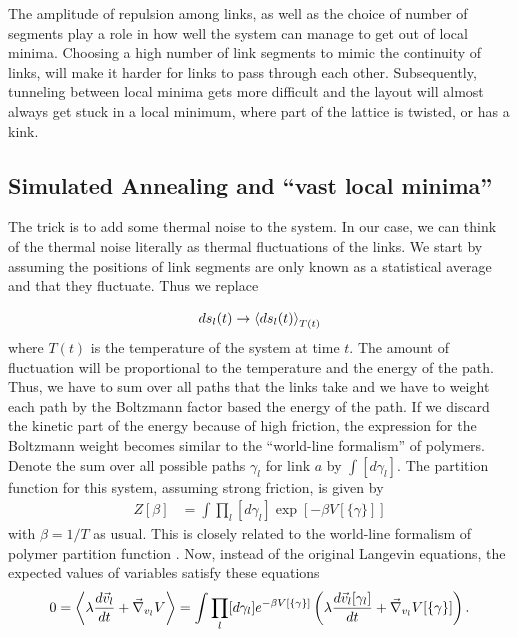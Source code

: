 \documentclass[nofootinbib,preprint,floatfix,titlepage,superscriptaddress]{revtex4} %
\begin{document}
The amplitude of repulsion among links, as well as the choice of number of segments  play a role in how well the system can manage to get out of local minima. 
Choosing a high number of link segments to mimic the continuity of links, will make it harder for links to pass through each other. 
Subsequently, tunneling between local minima gets more difficult and the layout will almost always get stuck in a local minimum, where part of the lattice is twisted, or has a kink.


\subsection{Simulated Annealing and ``vast local minima'' \label{ap:annealing}}
The trick is to add some thermal noise to the system. In our case, we can think of the thermal noise literally as thermal fluctuations of the links. We start by assuming the positions of link segments are only known as a statistical average and that they fluctuate. Thus we replace

\[ds_l(t) \to \left<ds_l(t)\right>_{T(t)} \]
where $T(t)$ is the temperature of the system at time $t$. 
The amount of fluctuation will be proportional to the temperature and the energy of the path. Thus, we have to sum over all paths that the links take and we have to weight each path by the Boltzmann factor based the energy of the path. If we discard the kinetic part of the energy because of high friction, the expression for the Boltzmann weight becomes similar to the ``world-line formalism'' of polymers. Denote the sum over all possible paths $\gamma_l$ for link $a$ by $\int [d\gamma_l]$. The partition function for this system, assuming strong friction, is given by
\begin{align}
    Z[\beta] & = \int \prod_l [d\gamma_l] \exp\left[-\beta V[\{\gamma\}]\right]  
\end{align}
with $\beta = 1/T$ as usual. 
This is closely related to the world-line formalism of polymer partition function \cite{des1974lagrangian}. 
Now, instead of the original Langevin equations, the expected values of variables satisfy these equations
\begin{equation}
0= \left<\lambda {d \vec{v}_l \over dt } + \vec{\nabla}_{{v}_l} V\right> = \int \prod_l [d\gamma_l] e^{-\beta V[\{\gamma\}]}\left(\lambda {d \vec{v}_l[\gamma_l] \over dt } + \vec{\nabla}_{{v}_l} V[\{\gamma\}]\right)  \label{eq:Langevin2}.
\end{equation}
\end{document}
